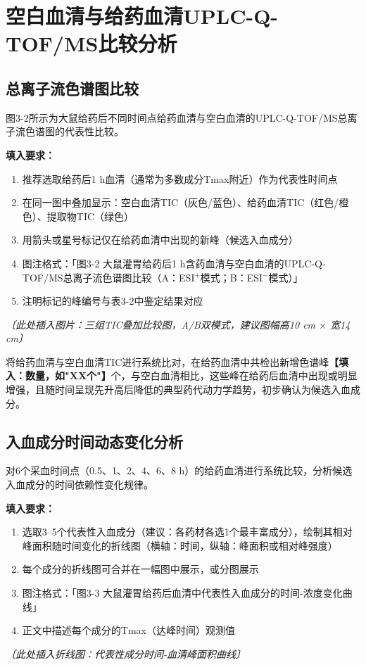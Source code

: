 \documentclass[12pt,a4paper,UTF8,openany]{ctexbook}
\begin{document}
\section{空白血清与给药血清UPLC-Q-TOF/MS比较分析}

\subsection{总离子流色谱图比较}

图3-2所示为大鼠给药后不同时间点给药血清与空白血清的UPLC-Q-TOF/MS总离子流色谱图的代表性比较。

\begin{tcolorbox}[colback=orange!5!white,colframe=orange!60!black,title={\textbf{【待填入】图3-2：空白血清vs.给药血清TIC比较图}},fonttitle=\small\bfseries]
\textbf{填入要求：}
\begin{enumerate}
  \item 推荐选取给药后1 h血清（通常为多数成分Tmax附近）作为代表性时间点
  \item 在同一图中叠加显示：空白血清TIC（灰色/蓝色）、给药血清TIC（红色/橙色）、提取物TIC（绿色）
  \item 用箭头或星号标记仅在给药血清中出现的新峰（候选入血成分）
  \item 图注格式：「图3-2 大鼠灌胃给药后1 h含药血清与空白血清的UPLC-Q-TOF/MS总离子流色谱图比较（A：ESI$^+$模式；B：ESI$^-$模式）」
  \item 注明标记的峰编号与表3-2中鉴定结果对应
\end{enumerate}
\textit{〔此处插入图片：三组TIC叠加比较图，A/B双模式，建议图幅高10 cm $\times$ 宽14 cm〕}
\end{tcolorbox}

将给药血清与空白血清TIC进行系统比对，在给药血清中共检出新增色谱峰\textbf{【填入：数量，如"XX个"】}个，与空白血清相比，这些峰在给药后血清中出现或明显增强，且随时间呈现先升高后降低的典型药代动力学趋势，初步确认为候选入血成分。

\subsection{入血成分时间动态变化分析}

对6个采血时间点（0.5、1、2、4、6、8 h）的给药血清进行系统比较，分析候选入血成分的时间依赖性变化规律。

\begin{tcolorbox}[colback=orange!5!white,colframe=orange!60!black,title={\textbf{【待填入】图3-3：代表性入血成分时间浓度曲线}},fonttitle=\small\bfseries]
\textbf{填入要求：}
\begin{enumerate}
  \item 选取3--5个代表性入血成分（建议：各药材各选1个最丰富成分），绘制其相对峰面积随时间变化的折线图（横轴：时间，纵轴：峰面积或相对峰强度）
  \item 每个成分的折线图可合并在一幅图中展示，或分图展示
  \item 图注格式：「图3-3 大鼠灌胃给药后血清中代表性入血成分的时间-浓度变化曲线」
  \item 正文中描述每个成分的Tmax（达峰时间）观测值
\end{enumerate}
\textit{〔此处插入折线图：代表性成分时间-血清峰面积曲线〕}
\end{tcolorbox}
\end{document}
